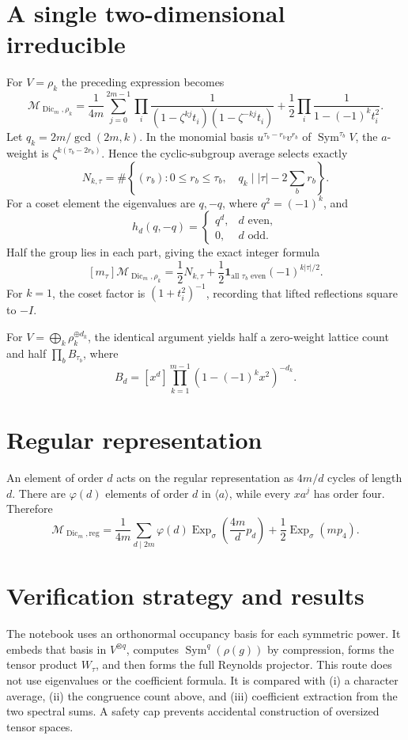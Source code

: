 \documentclass[11pt]{article}
\newcommand{\Dic}{\operatorname{Dic}}
\newcommand{\Sym}{\operatorname{Sym}}
\newcommand{\M}{\mathcal M}
\begin{document}
\section{A single two-dimensional irreducible}
For $V=\rho_k$ the preceding expression becomes
\[
 \boxed{\M_{\Dic_m,\rho_k}=
 \frac1{4m}\sum_{j=0}^{2m-1}\prod_i
 \frac1{(1-\zeta^{kj}t_i)(1-\zeta^{-kj}t_i)}
 +\frac12\prod_i\frac1{1-(-1)^kt_i^2}.}
\]
Let $q_k=2m/\gcd(2m,k)$.  In the monomial basis
$u^{\tau_b-r_b}v^{r_b}$ of $\Sym^{\tau_b}V$, the $a$-weight is
$\zeta^{k(\tau_b-2r_b)}$.  Hence the cyclic-subgroup average selects exactly
\[
 N_{k,\tau}=\#\left\{(r_b):0\le r_b\le\tau_b,\quad
 q_k\mid |\tau|-2\sum_b r_b\right\}.
\]
For a coset element the eigenvalues are $q,-q$, where $q^2=(-1)^k$, and
\[
 h_d(q,-q)=\begin{cases}q^d,&d\text{ even},\\0,&d\text{ odd}.
 \end{cases}
\]
Half the group lies in each part, giving the exact integer formula
\[
 \boxed{[m_\tau]\M_{\Dic_m,\rho_k}
 =\frac12N_{k,\tau}+\frac12\mathbf1_{\text{all }\tau_b\text{ even}}
 (-1)^{k|\tau|/2}.}
\]
For $k=1$, the coset factor is $(1+t_i^2)^{-1}$, recording that lifted
reflections square to $-I$.

For $V=\bigoplus_k\rho_k^{\oplus d_k}$, the identical argument yields half a
zero-weight lattice count and half $\prod_bB_{\tau_b}$, where
\[
 B_d=[x^d]\prod_{k=1}^{m-1}(1-(-1)^kx^2)^{-d_k}.
\]

\section{Regular representation}
An element of order $d$ acts on the regular representation as $4m/d$ cycles
of length $d$.  There are $\varphi(d)$ elements of order $d$ in
$\langle a\rangle$, while every $xa^j$ has order four.  Therefore
\[
 \boxed{\M_{\Dic_m,\mathrm{reg}}=
 \frac1{4m}\sum_{d\mid2m}\varphi(d)
 \operatorname{Exp}_\sigma\!\left(\frac{4m}{d}p_d\right)
 +\frac12\operatorname{Exp}_\sigma(mp_4).}
\]

\section{Verification strategy and results}
The notebook uses an orthonormal occupancy basis for each symmetric power.
It embeds that basis in $V^{\otimes q}$, computes
$\Sym^q(\rho(g))$ by compression, forms the tensor product $W_\tau$, and then
forms the full Reynolds projector.  This route does not use eigenvalues or the
coefficient formula.  It is compared with (i) a character average, (ii) the
congruence count above, and (iii) coefficient extraction from the two spectral
sums.  A safety cap prevents accidental construction of oversized tensor
spaces.
\end{document}
